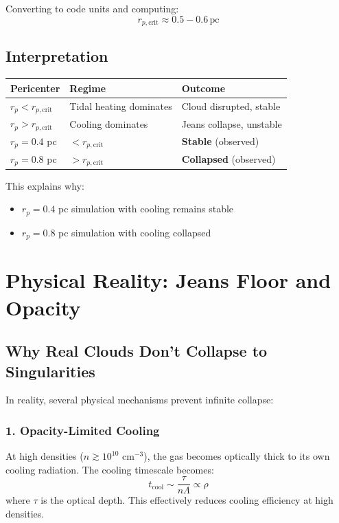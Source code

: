 \documentclass[12pt,a4paper]{article}
\begin{document}
Converting to code units and computing:
\begin{equation}
    r_{p,\text{crit}} \approx 0.5 - 0.6 \, \text{pc}
\end{equation}

\subsection{Interpretation}

\begin{center}
\begin{tabular}{lll}
\toprule
Pericenter & Regime & Outcome \\
\midrule
$r_p < r_{p,\text{crit}}$ & Tidal heating dominates & Cloud disrupted, stable \\
$r_p > r_{p,\text{crit}}$ & Cooling dominates & Jeans collapse, unstable \\
\midrule
$r_p = 0.4$ pc & $< r_{p,\text{crit}}$ & \textbf{Stable} (observed) \\
$r_p = 0.8$ pc & $> r_{p,\text{crit}}$ & \textbf{Collapsed} (observed) \\
\bottomrule
\end{tabular}
\end{center}

This explains why:
\begin{itemize}
    \item $r_p = 0.4$ pc simulation with cooling remains stable
    \item $r_p = 0.8$ pc simulation with cooling collapsed
\end{itemize}

\section{Physical Reality: Jeans Floor and Opacity}

\subsection{Why Real Clouds Don't Collapse to Singularities}

In reality, several physical mechanisms prevent infinite collapse:

\subsubsection{1. Opacity-Limited Cooling}

At high densities ($n \gtrsim 10^{10}$ cm$^{-3}$), the gas becomes optically thick
to its own cooling radiation. The cooling timescale becomes:
\begin{equation}
    t_{\text{cool}} \sim \frac{\tau}{n \Lambda} \propto \rho
\end{equation}
where $\tau$ is the optical depth. This effectively reduces cooling efficiency
at high densities.
\end{document}
